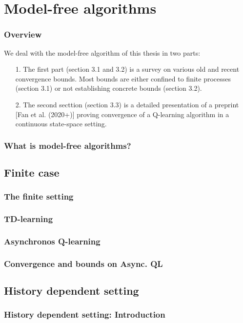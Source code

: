 \documentclass{beamer}[10]
\begin{document}
\section{Model-free algorithms}

\begin{frame}
  \frametitle{Overview}
  We deal with the model-free algorithm of this thesis in two parts:
  \begin{itemize}
    \item[1.] The first part (section 3.1 and 3.2) is a survey
      on various old and recent convergence bounds. Most bounds
      are either confined to finite processes (section 3.1) or
      not establishing concrete bounds (section 3.2).
    \item[2.] The second secttion (section 3.3) is a detailed
      presentation of a preprint [Fan et al. (2020+)] proving convergence
      of a Q-learning algorithm in a continuous state-space setting.
  \end{itemize} 
\end{frame}

\begin{frame}
  \frametitle{What is model-free algorithms?}

\end{frame}

\subsection{Finite case}

\begin{frame}
  \frametitle{The finite setting}
\end{frame}

\begin{frame}
  \frametitle{TD-learning}
\end{frame}

\begin{frame}
  \frametitle{Asynchronos Q-learning}
\end{frame}

\begin{frame}
  \frametitle{Convergence and bounds on Async. QL}

\end{frame}

\subsection{History dependent setting}

\begin{frame}
  \frametitle{History dependent setting: Introduction}

\end{frame}
\end{document}
